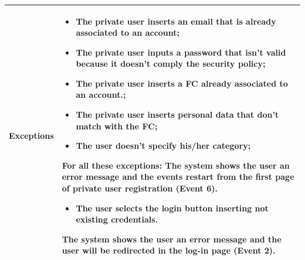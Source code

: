 \documentclass[titlepage]{article}
\begin{document}
\begin{longtable}{| p{3 cm} | p{10 cm} |}
\textbf{Exceptions} & 
\begin{itemize}
	\item The private user inserts an email that is already associated to an account;
	\item The private user inputs a password that isn't valid because it doesn't comply the security policy;
	\item The private user inserts a FC already associated to an account.;
	\item The private user inserts personal data that don't match with the FC;
	\item The user doesn't specify his/her category;
\end{itemize} 
							
For all these exceptions: The system shows the user an error message and the events restart from the first page of private user registration (Event 6).


\begin{itemize}
\item The user selects the login button inserting not existing credentials.
\end{itemize} 
The system shows the user an error message and the user will be redirected in the log-in page (Event 2).

\\ \hline
							

\end{longtable}

\newpage
\end{document}
